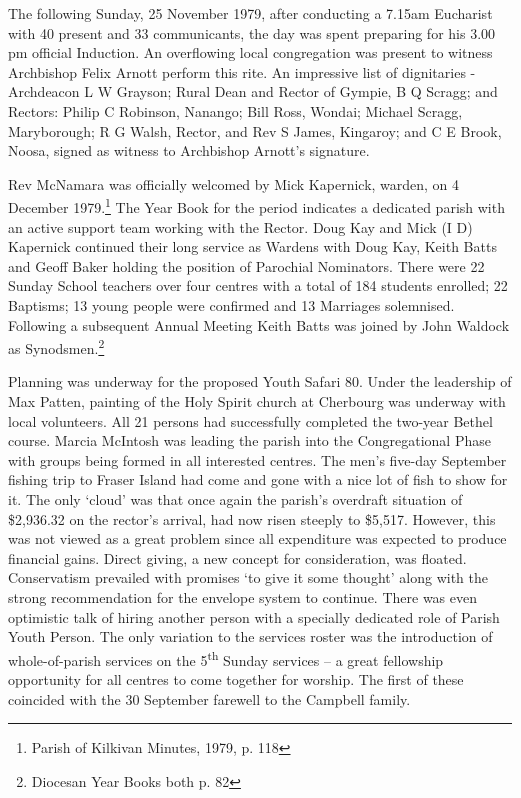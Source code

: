 The following Sunday, 25 November 1979, after conducting a 7.15am Eucharist with 40 present and 33 communicants, the day was spent preparing for his 3.00 pm official Induction. An overflowing local congregation was present to witness Archbishop Felix Arnott perform this rite. An impressive list of dignitaries - Archdeacon L W Grayson; Rural Dean and Rector of Gympie, B Q Scragg; and Rectors: Philip C Robinson, Nanango; Bill Ross, Wondai; Michael Scragg, Maryborough; R G Walsh, Rector, and Rev S James, Kingaroy; and C E Brook, Noosa, signed as witness to Archbishop Arnott's signature.



Rev McNamara was officially welcomed by Mick Kapernick, warden, on 4 December 1979.\footnote{Parish of Kilkivan Minutes, 1979, p. 118} The Year Book for the period indicates a dedicated parish with an active support team working with the Rector. Doug Kay and Mick (I D) Kapernick continued their long service as Wardens with Doug Kay, Keith Batts and Geoff Baker holding the position of Parochial Nominators. There were 22 Sunday School teachers over four centres with a total of 184 students enrolled; 22 Baptisms; 13 young people were confirmed and 13 Marriages solemnised. Following a subsequent Annual Meeting Keith Batts was joined by John Waldock as Synodsmen.\footnote{Diocesan Year Books both p. 82}


Planning was underway for the proposed Youth Safari 80. Under the leadership of Max Patten, painting of the Holy Spirit church at Cherbourg was underway with local volunteers. All 21 persons had successfully completed the two-year Bethel course. Marcia McIntosh was leading the parish into the Congregational Phase with groups being formed in all interested centres. The men's five-day September fishing trip to Fraser Island had come and gone with a nice lot of fish to show for it. The only `cloud' was that once again the parish's overdraft situation of \$2,936.32 on the rector's arrival, had now risen steeply to \$5,517. However, this was not viewed as a great problem since all expenditure was expected to produce financial gains. Direct giving, a new concept for consideration, was floated. Conservatism prevailed with promises `to give it some thought' along with the strong recommendation for the envelope system to continue. There was even optimistic talk of hiring another person with a specially dedicated role of Parish Youth Person. The only variation to the services roster was the introduction of whole-of-parish services on the 5\textsuperscript{th} Sunday services -- a great fellowship opportunity for all centres to come together for worship. The first of these coincided with the 30 September farewell to the Campbell family.



